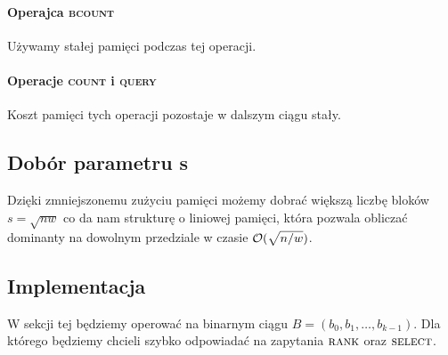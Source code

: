\paragraph{Operajca \textsc{bcount}} Używamy stałej pamięci podczas tej operacji.
\paragraph{Operacje \textsc{count} i \textsc{query}} Koszt pamięci tych operacji pozostaje w dalszym ciągu stały.

\subsection{Dobór parametru s}
Dzięki zmniejszonemu zużyciu pamięci możemy dobrać większą liczbę bloków $s=\sqrt{nw}$ co da nam strukturę o liniowej pamięci, która pozwala obliczać dominanty na dowolnym przedziale w czasie $\mathcal{O}(\sqrt{n/w})$.

\subsection{Implementacja}
W sekcji tej będziemy operować na binarnym ciągu $B=(b_0, b_1, \dots, b_{k-1})$. Dla którego będziemy chcieli szybko odpowiadać na zapytania $\textsc{rank}$ oraz $\textsc{select}$.
